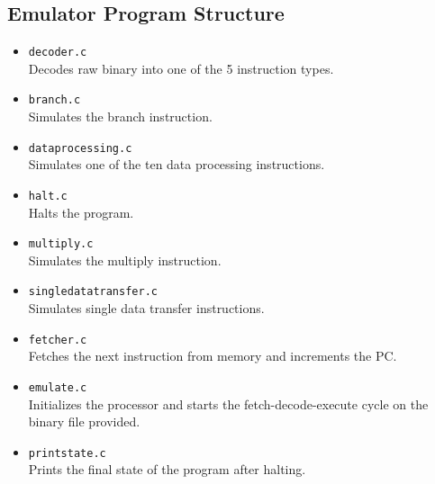 \documentclass[8pt]{article}
\begin{document}
\begin{minipage}{0.45\textwidth}
\subsection{Emulator Program Structure}

\begin{itemize}
    \item \texttt{decoder.c} \\ Decodes raw binary into one of the 5 instruction 
    types.
    \item \texttt{branch.c} \\ Simulates the branch instruction.
    \item \texttt{dataprocessing.c} \\ Simulates one of the ten data processing 
    instructions.
    \item \texttt{halt.c} \\  Halts the program.
    \item \texttt{multiply.c} \\ Simulates the multiply instruction.
    \item \texttt{singledatatransfer.c} \\ Simulates single data transfer instructions.
    \item \texttt{fetcher.c} \\ Fetches the next instruction from memory and
    increments the PC.
    \item \texttt{emulate.c} \\ Initializes the processor and starts the fetch-decode-execute
    cycle on the binary file provided. 
    \item \texttt{printstate.c} \\ Prints the final state of the program after 
    halting.
\end{itemize}
\end{minipage}%
\hfill
\end{document}
